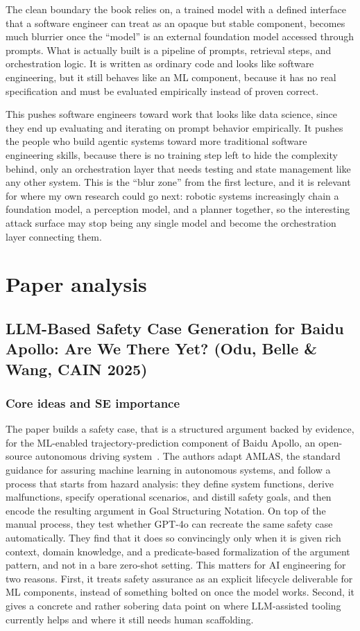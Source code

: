 \documentclass[11pt,a4paper]{article}
\begin{document}
The clean boundary the book relies on, a trained model with a defined interface that a software engineer can treat as an opaque but stable component, becomes much blurrier once the ``model'' is an external foundation model accessed through prompts. What is actually built is a pipeline of prompts, retrieval steps, and orchestration logic. It is written as ordinary code and looks like software engineering, but it still behaves like an ML component, because it has no real specification and must be evaluated empirically instead of proven correct.

This pushes software engineers toward work that looks like data science, since they end up evaluating and iterating on prompt behavior empirically. It pushes the people who build agentic systems toward more traditional software engineering skills, because there is no training step left to hide the complexity behind, only an orchestration layer that needs testing and state management like any other system. This is the ``blur zone'' from the first lecture, and it is relevant for where my own research could go next: robotic systems increasingly chain a foundation model, a perception model, and a planner together, so the interesting attack surface may stop being any single model and become the orchestration layer connecting them.


\section{Paper analysis}


\subsection{LLM-Based Safety Case Generation for Baidu Apollo: Are We There Yet? (Odu, Belle \& Wang, CAIN 2025)}

\subsubsection{Core ideas and SE importance}

The paper builds a safety case, that is a structured argument backed by evidence, for the ML-enabled trajectory-prediction component of Baidu Apollo, an open-source autonomous driving system~\cite{odu2025safetycase}. The authors adapt AMLAS, the standard guidance for assuring machine learning in autonomous systems, and follow a process that starts from hazard analysis: they define system functions, derive malfunctions, specify operational scenarios, and distill safety goals, and then encode the resulting argument in Goal Structuring Notation. On top of the manual process, they test whether GPT-4o can recreate the same safety case automatically. They find that it does so convincingly only when it is given rich context, domain knowledge, and a predicate-based formalization of the argument pattern, and not in a bare zero-shot setting. This matters for AI engineering for two reasons. First, it treats safety assurance as an explicit lifecycle deliverable for ML components, instead of something bolted on once the model works. Second, it gives a concrete and rather sobering data point on where LLM-assisted tooling currently helps and where it still needs human scaffolding.
\end{document}
